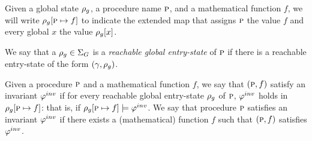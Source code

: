 Given a global state $\rho_g$, a procedure name $\textsc{p}$, and a mathematical function $f$, we will write
$\rho_g[\textsc{p} \mapsto f]$ to indicate the extended map that assigns $\textsc{p}$ the value $f$ and every
global $x$ the value $\rho_g[x]$.


We say that a $\rho_g \in \Sigma_G$ is a \emph{reachable global entry-state} of $\textsc{p}$ if
there is a reachable entry-state of the form $(\gamma,\rho_g)$.

\begin{definition}[Invariant]
Given a procedure $\textsc{p}$ and a mathematical function $f$, we say that $(\textsc{p},f)$ satisfy
an invariant $\varphi^{inv}$ if for every reachable global entry-state $\rho_g$ of $\textsc{p}$,
$\varphi^{inv}$ holds in $\rho_g[\textsc{p} \mapsto f]$: that is, if $\rho_g[\textsc{p} \mapsto f] \models \varphi^{inv}$.
We say that procedure $\textsc{p}$ satisfies an invariant $\varphi^{inv}$ if there exists a (mathematical)
function $f$ such that $(\textsc{p},f)$ satisfies $\varphi^{inv}$.
\end{definition}